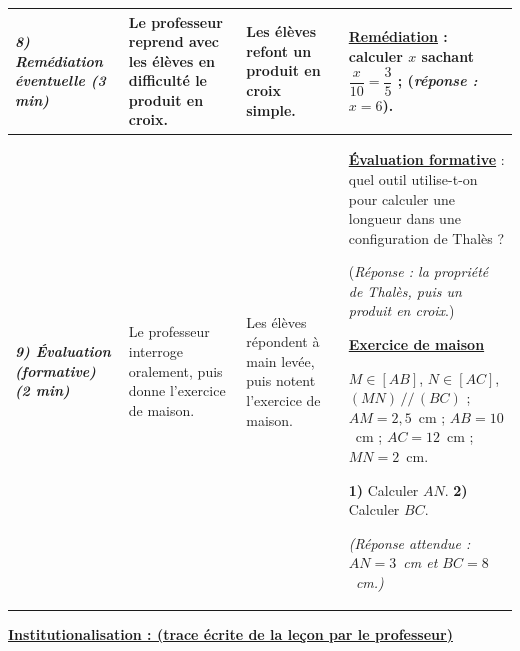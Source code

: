 \documentclass[10pt]{article}
\newcommand{\titreR}[1]{\underline{\textcolor{rougetitre}{\bfseries #1}}}
\newcommand{\maison}{\underline{\textcolor{rougemaison}{\bfseries Exercice de maison}}}
\newcommand{\moment}[1]{\textbf{\itshape #1}}
\begin{document}
\begin{longtable}{|p{2.35cm}|p{5.35cm}|p{4.55cm}|p{13.85cm}|}
\moment{8) Remédiation éventuelle (3 min)} &
Le professeur reprend avec les élèves en difficulté  le produit en croix. &
Les élèves refont  un produit en croix simple. &
\titreR{Remédiation} : calculer $x$ sachant $\dfrac{x}{10}=\dfrac{3}{5}$ ;
(\textit{réponse : $x=6$}). \\ \hline

\moment{9) Évaluation (formative) (2 min)} &
Le professeur interroge oralement, puis donne l'exercice de maison. &
Les élèves répondent à main levée, puis notent l'exercice de maison. &
\titreR{Évaluation formative} : quel outil utilise-t-on pour calculer une longueur
dans une configuration de Thalès ? \par
(\textit{Réponse : la propriété de Thalès, puis un produit en croix}.) \par
\maison \par
$M\in[AB]$, $N\in[AC]$, $(MN)\,//\,(BC)$ ; $AM=2{,}5$~cm ; $AB=10$~cm ;
$AC=12$~cm ; $MN=2$~cm. \par
\textbf{1)} Calculer $AN$. \quad \textbf{2)} Calculer $BC$. \par
\textit{(Réponse attendue : $AN=3$~cm et $BC=8$~cm.)} \\ \hline
\end{longtable}

\begin{center}
\underline{\textcolor{rougetitre}{\large\bfseries Institutionalisation \; : \; (trace écrite de la leçon par le professeur)}}
\end{center}
\end{document}
